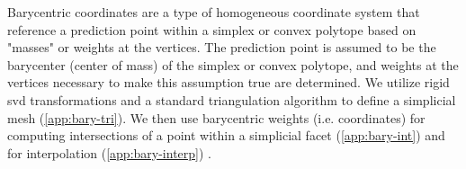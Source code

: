 \documentclass[preprint,12pt]{elsarticle}
\begin{document}


Barycentric coordinates are a type of homogeneous coordinate system that reference a prediction point within a simplex \cite{langerSphericalBarycentricCoordinates2006} or convex polytope \cite{floaterGeneralizedBarycentricCoordinates2015,meyerGeneralizedBarycentricCoordinates2002,langerSphericalBarycentricCoordinates2006} based on "masses" or weights at the vertices. The prediction point is assumed to be the barycenter (center of mass) of the simplex or convex polytope, and weights at the vertices necessary to make this assumption true are determined. We utilize rigid \gls{svd} transformations and a standard triangulation algorithm to define a simplicial mesh (\cref{app:bary-tri}). We then use barycentric weights (i.e. coordinates) for computing intersections of a point within a simplicial facet (\cref{app:bary-int}) and for interpolation (\cref{app:bary-interp}) \cite{langerSphericalBarycentricCoordinates2006}.

\subsubsection{}
\label{sec:methods:interp:gpr}

\end{document}

